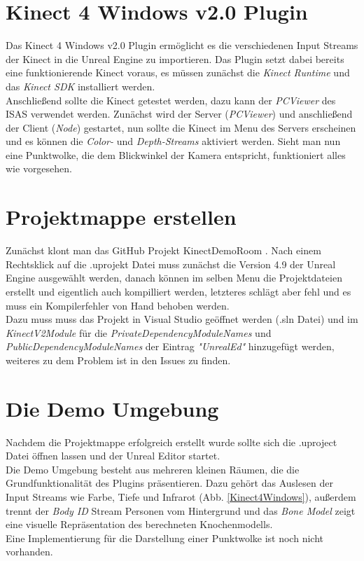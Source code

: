 \documentclass[a4paper]{IEEEtran}
\begin{document}
	
\section{Kinect 4 Windows v2.0 Plugin}
	Das Kinect 4 Windows v2.0 Plugin ermöglicht es die verschiedenen Input Streams der Kinect in die Unreal Engine zu importieren. Das Plugin setzt dabei bereits eine funktionierende Kinect voraus, es müssen zunächst die {\textit{Kinect Runtime}} {\cite{kinectruntime}} und das {\textit{Kinect SDK}} {\cite{kinectsdk}} installiert werden. \\
	Anschließend sollte die Kinect getestet werden, dazu kann der {\textit{PCViewer}} des ISAS verwendet werden. 
	Zunächst wird der Server ({\textit{PCViewer}}) und anschließend der Client ({\textit{Node}}) gestartet, nun sollte die Kinect im Menu des Servers erscheinen und es können die {\textit{Color-}} und {\textit{Depth-Streams}} aktiviert werden. 
	Sieht man nun eine Punktwolke, die dem Blickwinkel der Kamera entspricht, funktioniert alles wie vorgesehen.\\
	

\section{Projektmappe erstellen}
	Zunächst klont man das GitHub Projekt KinectDemoRoom {\cite{k4w}}. 
	Nach einem Rechtsklick auf die .uprojekt Datei muss zunächst die Version 4.9 der Unreal Engine ausgewählt werden, danach können im selben Menu die Projektdateien erstellt und eigentlich auch kompilliert werden, letzteres schlägt aber fehl und es muss ein Kompilerfehler von Hand behoben werden. \\
	Dazu muss muss das Projekt in Visual Studio geöffnet werden (.sln Datei) und  im {\textit{KinectV2Module}} für die {\textit{PrivateDependencyModuleNames}} und {\textit{PublicDependencyModuleNames}} der Eintrag {\textit{"{}UnrealEd"{}}} hinzugefügt werden, weiteres zu dem Problem ist in den Issues {\cite{k4wissues}} zu finden.\\

\section{Die Demo Umgebung}
	Nachdem die Projektmappe erfolgreich erstellt wurde sollte sich die .uproject Datei öffnen lassen und der Unreal Editor startet. \\
	Die Demo Umgebung besteht aus mehreren kleinen Räumen, die die Grundfunktionalität des Plugins präsentieren. 
	Dazu gehört das Auslesen der Input Streams wie Farbe, Tiefe und Infrarot (Abb. \ref{Kinect4Windows}), außerdem trennt der {\textit{Body ID}} Stream Personen vom Hintergrund und das {\textit{Bone Model}} zeigt eine visuelle Repräsentation des berechneten Knochenmodells. \\
	Eine Implementierung für die Darstellung einer Punktwolke ist noch nicht vorhanden. \\[0.5cm]
	
\end{document}
